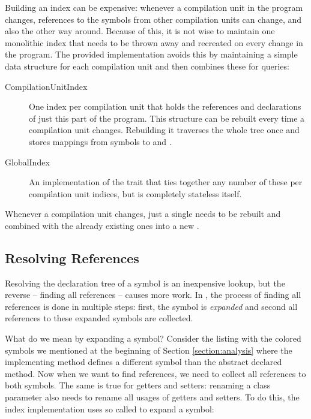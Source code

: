 Building an index can be expensive: whenever a compilation unit in the program changes, references to the symbols from other compilation units can change, and also the other way around. Because of this, it is not wise to maintain one monolithic index that needs to be thrown away and recreated on every change in the program. The provided implementation avoids this by maintaining a simple data structure for each compilation unit and then combines these for queries:

\begin{description}
 \item[CompilationUnitIndex] One index per compilation unit that holds the references and declarations of just this part of the program. This structure can be rebuilt every time a compilation unit changes. Rebuilding it traverses the whole tree once and stores mappings from symbols to  and .
 \item[GlobalIndex] An implementation of the  trait that ties together any number of these per compilation unit indices, but is completely stateless itself.
\end{description}

Whenever a compilation unit changes, just a single  needs to be rebuilt and combined with the already existing ones into a new .

\subsection{Resolving References}

Resolving the declaration tree of a symbol is an inexpensive lookup, but the reverse -- finding all references -- causes more work. In , the process of finding all references is done in multiple steps: first, the symbol is \textit{expanded} and second all references to these expanded symbols are collected. 

What do we mean by expanding a symbol? Consider the listing with the colored symbols we mentioned at the beginning of Section \ref{section:analysis} where the implementing method defines a different symbol than the abstract declared method. Now when we want to find references, we need to collect all references to both symbols. The same is true for getters and setters: renaming a class parameter also needs to rename all usages of getters and setters. To do this, the index implementation uses so called  to expand a symbol:


